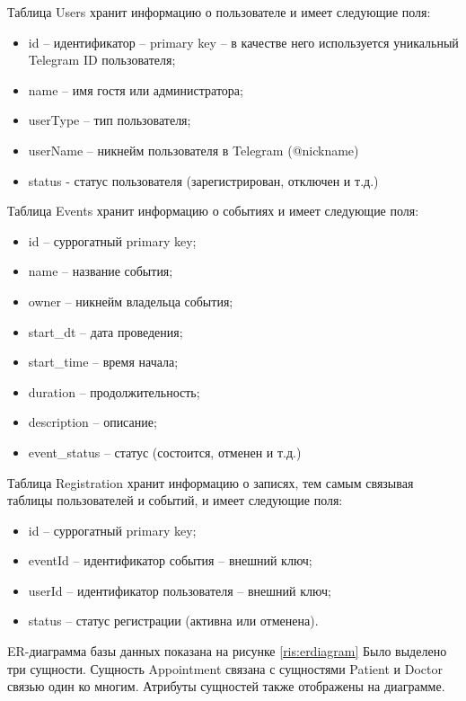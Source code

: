 \documentclass[12pt,a4paper,oneside]{report}
\begin{document}
Таблица Users хранит информацию о пользователе и имеет следующие поля:
\begin{itemize}
    \item id – идентификатор – primary key – в качестве него используется уникальный Telegram ID пользователя; 
    \item name – имя гостя или администратора;
    \item userType – тип пользователя;
    \item userName – никнейм пользователя в Telegram (@nickname)
    \item status - статус пользователя (зарегистрирован, отключен и т.д.)
\end{itemize}
Таблица Events хранит информацию о событиях и имеет следующие поля: 
\begin{itemize}
    \item id – суррогатный primary key;  
    \item name –  название события;
    \item owner – никнейм владельца события;
    \item {start\_dt} – дата проведения;
    \item {start\_time} – время начала;
    \item duration – продолжительность;
    \item description – описание;
    \item {event\_status} – статус (состоится, отменен и т.д.)
\end{itemize}

Таблица Registration хранит информацию о записях, тем самым связывая таблицы пользователей и событий, и имеет следующие поля: 
\begin{itemize}
    \item id – суррогатный primary key;    
    \item eventId – идентификатор события – внешний ключ; 
    \item userId – идентификатор пользователя – внешний ключ;
    \item status – статус регистрации (активна или отменена).
\end{itemize}

ER-диаграмма базы данных показана на рисунке \ref{ris:erdiagram} Было выделено три сущности. Сущность Appointment связана с сущностями Patient и Doctor связью один ко многим. Атрибуты сущностей также отображены на диаграмме.
\end{document}
